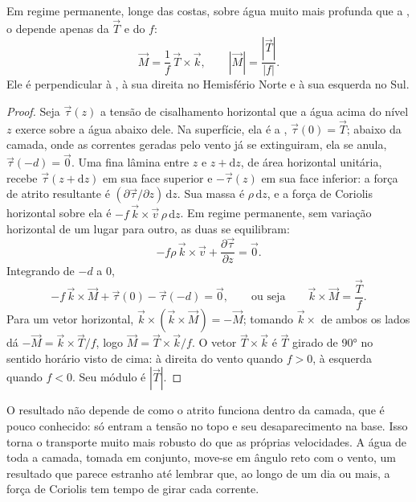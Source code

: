 \begin{theorem}\label{thm:b1:ocean-circulation:ekman}
Em regime permanente, longe das costas, sobre água muito mais profunda que a , o
 depende apenas da  $\vec T$ e do  $f$:
\[
  \vec M = \frac{1}{f}\,\vec T\times\vec k,
  \qquad |\vec M| = \frac{|\vec T|}{|f|}.
\]
Ele é perpendicular à , à sua direita no Hemisfério Norte e à sua esquerda no Sul.
\end{theorem}

\begin{proof}
Seja $\vec\tau(z)$ a tensão de cisalhamento horizontal que a água acima do nível $z$
exerce sobre a água abaixo dele. Na superfície, ela é a , $\vec\tau(0) =
\vec T$; abaixo da camada, onde as correntes geradas pelo vento já se extinguiram, ela
se anula, $\vec\tau(-d) = \vec 0$. Uma fina lâmina entre $z$ e $z + \mathrm dz$, de área
horizontal unitária, recebe $\vec\tau(z + \mathrm dz)$ em sua face superior e
$-\vec\tau(z)$ em sua face inferior: a força de atrito resultante é $(\partial\vec
\tau/\partial z)\,\mathrm dz$. Sua massa é $\rho\,\mathrm dz$, e a força de Coriolis
horizontal sobre ela é $-f\,\vec k\times\vec v\,\rho\,\mathrm dz$. Em regime
permanente, sem variação horizontal de um lugar para outro, as duas se equilibram:
\[
  -f\rho\,\vec k\times\vec v + \frac{\partial\vec\tau}{\partial z} = \vec 0 .
\]
Integrando de $-d$ a $0$,
\[
  -f\,\vec k\times\vec M + \vec\tau(0) - \vec\tau(-d) = \vec 0,
  \qquad\text{ou seja}\qquad \vec k\times\vec M = \frac{\vec T}{f}.
\]
Para um vetor horizontal, $\vec k\times(\vec k\times\vec M) = -\vec M$; tomando
$\vec k\times$ de ambos os lados dá $-\vec M = \vec k\times\vec T/f$, logo $\vec M =
\vec T\times\vec k/f$. O vetor $\vec T\times\vec k$ é $\vec T$ girado de
\ang{90} no sentido horário visto de cima: à direita do vento quando $f > 0$, à
esquerda quando $f < 0$. Seu módulo é $|\vec T|$.
\end{proof}

O resultado não depende de como o atrito funciona dentro da camada, que é
pouco conhecido: só entram a tensão no topo e seu desaparecimento na base.
Isso torna o transporte muito mais robusto do que as próprias velocidades. A água
de toda a camada, tomada em conjunto, move-se em ângulo reto com o vento, um resultado que
parece estranho até lembrar que, ao longo de um dia ou mais, a força de Coriolis tem
tempo de girar cada corrente.

